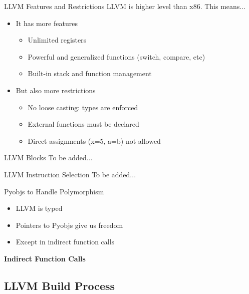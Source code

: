 \documentclass{beamer}
\begin{document}
\begin{frame}{LLVM Features and Restrictions}
  LLVM is higher level than x86. This means...
  \pause
  \begin{itemize}
  \item<1->It has more features
    \begin{itemize}
    \item<2->Unlimited registers
    \item<3->Powerful and generalized functions (switch, compare, etc)
    \item<4->Built-in stack and function management
    \end{itemize}
  \item<5->But also more restrictions
    \begin{itemize}
      \item<6-> No loose casting: types are enforced
      \item<7-> External functions must be declared
      \item<8-> Direct assignments (x=5, a=b) not allowed
    \end{itemize}
  \end{itemize}
\end{frame}

\begin{frame}{LLVM Blocks}
  To be added...
\end{frame}

\begin{frame}{LLVM Instruction Selection}
  To be added...
\end{frame}

\begin{frame}{Pyobjs to Handle Polymorphism}
\begin{itemize}
  \item<1->LLVM is typed
  \item<2->Pointers to Pyobjs give us freedom
  \item<3->Except in indirect function calls
\end{itemize}
\end{frame}

\begin{frame}{\bf Indirect Function Calls}
  
\end{frame}

\subsection{LLVM Build Process}
\end{document}

